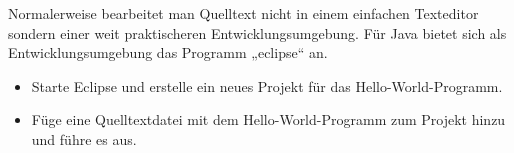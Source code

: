 Normalerweise bearbeitet man Quelltext nicht in einem einfachen Texteditor sondern einer weit praktischeren Entwicklungsumgebung.
Für Java bietet sich als Entwicklungsumgebung das Programm „eclipse“ an.
\begin{itemize}
\item Starte Eclipse und erstelle ein neues Projekt für das Hello-World-Programm.
\item Füge eine Quelltextdatei mit dem Hello-World-Programm zum Projekt hinzu und führe es aus.
\end{itemize}
